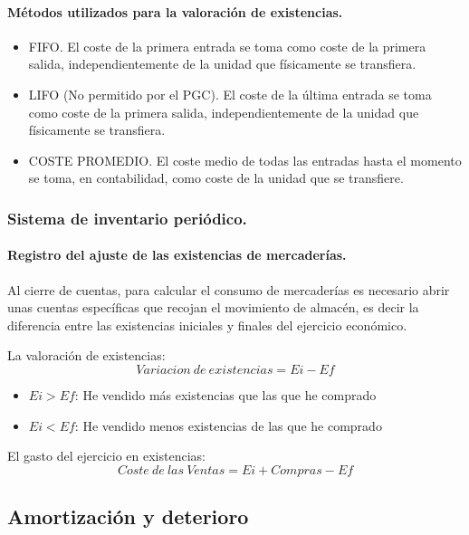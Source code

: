 \paragraph{Métodos utilizados para la valoración de existencias.}
\begin{itemize}
    \item FIFO. El coste de la primera entrada se toma como coste de la primera salida, independientemente de la unidad que físicamente se transfiera.
    \item LIFO (No permitido por el PGC). El coste de la última entrada se toma como coste de la primera salida, independientemente de la unidad que físicamente se transfiera.
    \item COSTE PROMEDIO. El coste medio de todas las entradas hasta el momento se toma, en contabilidad, como coste de la unidad que se transfiere.
\end{itemize}

\subsubsection{Sistema de inventario periódico.}

\paragraph{Registro del ajuste de las existencias de mercaderías.}
Al cierre de cuentas, para calcular el consumo de mercaderías es necesario abrir unas cuentas específicas que recojan el movimiento de almacén, es decir la diferencia entre las existencias iniciales y finales del ejercicio económico.

La valoración de existencias:
\[ Variacion\ de\ existencias = Ei - Ef \]

\begin{itemize}
    \item $Ei > Ef$: He vendido más existencias que las que he comprado
    \item $Ei < Ef$: He vendido menos existencias de las que he comprado
\end{itemize}

El gasto del ejercicio en existencias:
\[ Coste\ de\ las\ Ventas = Ei + Compras - Ef \]

\subsection{Amortización y deterioro}
